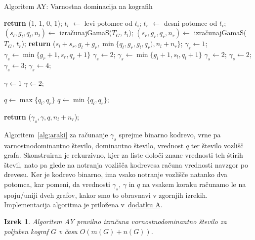 \documentclass[12pt,a4paper,twoside]{article}
\theoremstyle{definition} %
\theoremstyle{plain} %
\newtheorem{izrek}[definicija]{Izrek}
\numberwithin{equation}{section}  %
\begin{document}
\begin{algorithm}[h]
\caption{Algoritem AY: Varnostna dominacija na kografih}\label{alg:araki}
\begin{algorithmic}[1]
   \textbf{return} (1, 1, 0, 1); \EndIf
  \State $t_l$ $\leftarrow$ levi potomec od $t_i$;
  \State $t_r$ $\leftarrow$ desni potomec od $t_i$;
  \State $(s_l, g_l, q_l, n_l) \leftarrow$ izračunajGamaS($T_G$, $t_l$);
  \State $(s_r, g_r, q_r, n_r) \leftarrow$ izračunajGamaS($T_G$, $t_r$);
  \State \textbf{return} ($s_l + s_r, g_l + g_r, \min\{q_l, g_r, g_l, q_r), n_l + n_r\}$;
  \Else
  	 $\gamma_s \leftarrow 1$;
    	 $\gamma_s \leftarrow \min\{g_r + 1, s_r, q_r + 1\}$ \Else \State $\gamma_s \leftarrow 2$; \EndIf
  		 $\gamma_s \leftarrow \min\{g_l + 1, s_l, q_l + 1\}$ \Else   \State$\gamma_s \leftarrow 2$; \EndIf
  	\Else
    	 $\gamma_s \leftarrow 2$;
  		 $\gamma_s \leftarrow 3$;
  		\Else
  		    \State $\gamma_s \leftarrow 4$; \EndIf
  	\EndIf
  \EndIf
  
   $\gamma \leftarrow 1$
  \Else
    \State $\gamma \leftarrow 2$;
  \EndIf
  
   $q \leftarrow \max\{q_l, q_r\}$
  \Else
    \State $q \leftarrow \min\{q_l, q_r\}$;
  \EndIf
  
  \State \textbf{return} ($\gamma_s, \gamma, q, n_l + n_r$);
\EndFunction
\end{algorithmic}
\end{algorithm}
Algoritem~\ref{alg:araki} za računanje $\gamma_s$ sprejme binarno kodrevo, vrne pa varnostnodominantno število, dominantno število, vrednost $q$ ter število vozlišč grafa. Skonstruiran je rekurzivno, kjer za liste določi znane vrednosti teh štirih števil, nato pa glede na notranja vozlišča kodrevesa računa vrednosti navzgor po drevesu. Ker je kodrevo binarno, ima vsako notranje vozlišče natanko dva potomca, kar pomeni, da vrednosti $\gamma_s$, $\gamma$ in $q$ na vsakem koraku računamo le na spoju/uniji dveh grafov, kakor smo to obravnavi v zgornjih izrekih.
Implementacija algoritma je priložena v~\hyperref[sec:dodatekA]{dodatku A}.
\begin{izrek}
Algoritem AY pravilno izračuna varnostnodominantno število za poljuben kograf $G$ v času $O(m(G) + n(G))$.
\end{izrek}
\end{document}
